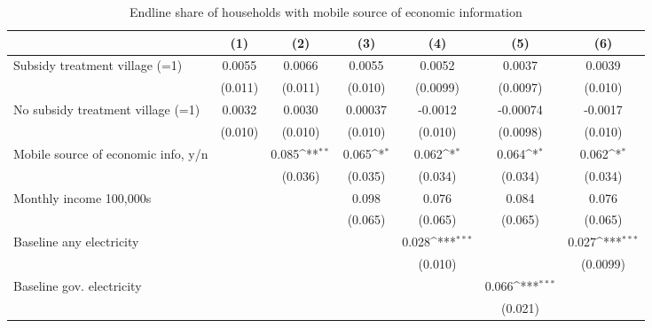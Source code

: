 \begin{table}[htbp]\centering
\def\sym#1{\ifmmode^{#1}\else\(^{#1}\)\fi}
\caption{Endline share of households with mobile source of economic information}
\begin{tabular*}{1\hsize}{@{\hskip\tabcolsep\extracolsep\fill}l*{6}{c}}
\toprule
                &\multicolumn{1}{c}{(1)}         &\multicolumn{1}{c}{(2)}         &\multicolumn{1}{c}{(3)}         &\multicolumn{1}{c}{(4)}         &\multicolumn{1}{c}{(5)}         &\multicolumn{1}{c}{(6)}         \\
\midrule
Subsidy treatment village (=1)&   0.0055         &   0.0066         &   0.0055         &   0.0052         &   0.0037         &   0.0039         \\
                &  (0.011)         &  (0.011)         &  (0.010)         & (0.0099)         & (0.0097)         &  (0.010)         \\
No subsidy treatment village (=1)&   0.0032         &   0.0030         &  0.00037         &  -0.0012         & -0.00074         &  -0.0017         \\
                &  (0.010)         &  (0.010)         &  (0.010)         &  (0.010)         & (0.0098)         &  (0.010)         \\
Mobile source of economic info, y/n&                  &    0.085\sym{**} &    0.065\sym{*}  &    0.062\sym{*}  &    0.064\sym{*}  &    0.062\sym{*}  \\
                &                  &  (0.036)         &  (0.035)         &  (0.034)         &  (0.034)         &  (0.034)         \\
Monthly income 100,000s&                  &                  &    0.098         &    0.076         &    0.084         &    0.076         \\
                &                  &                  &  (0.065)         &  (0.065)         &  (0.065)         &  (0.065)         \\
Baseline any electricity&                  &                  &                  &    0.028\sym{***}&                  &    0.027\sym{***}\\
                &                  &                  &                  &  (0.010)         &                  & (0.0099)         \\
Baseline gov. electricity&                  &                  &                  &                  &    0.066\sym{***}&                  \\
                &                  &                  &                  &                  &  (0.021)         &                  \\

\end{tabular*}
\end{table}
